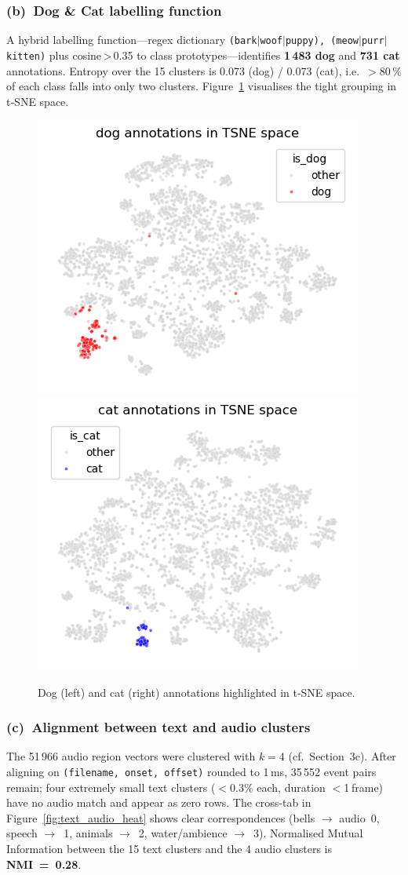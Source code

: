 \documentclass{article}
\begin{document}
\subsubsection{(b) Dog \& Cat labelling function}
A hybrid labelling function—regex dictionary
\texttt{\small(bark$\mid$woof$\mid$puppy), (meow$\mid$purr$\mid$kitten)} plus
cosine\,>\,0.35 to class prototypes—identifies \textbf{1\,483 dog} and
\textbf{731 cat} annotations.  
Entropy over the 15 clusters is 0.073 (dog) / 0.073 (cat), i.e.\ $>$80\,\% of
each class falls into only two clusters.
Figure~\ref{fig:dogcat_tsne} visualises the tight grouping in t‑SNE space.

\begin{figure}[h]
  \centering
  \includegraphics[width=.42\linewidth]{figs_tang/04_dog_annotations_in_tsne_space.png}\hfill
  \includegraphics[width=.42\linewidth]{figs_tang/04_cat_annotations_in_tsne_space.png}
  \caption{Dog (left) and cat (right) annotations highlighted in t‑SNE space.}
  \label{fig:dogcat_tsne}
\end{figure}

\subsubsection{(c) Alignment between text and audio clusters}
The 51\,966 audio region vectors were clustered with $k=4$
(cf.\ Section~3c).  
After aligning on \texttt{(filename, onset, offset)} rounded to 1\,ms,
35\,552 event pairs remain; four extremely small text clusters ($<0.3\%$
each, duration $<$1 frame) have no audio match and appear as zero rows.
The cross‑tab in Figure~\ref{fig:text_audio_heat} shows clear correspondences
(bells $\rightarrow$ audio 0, speech $\rightarrow$ 1, animals $\rightarrow$ 2,
water/ambience $\rightarrow$ 3).  
Normalised Mutual Information between the 15 text clusters and the 4 audio
clusters is \textbf{NMI = 0.28}.
\end{document}
